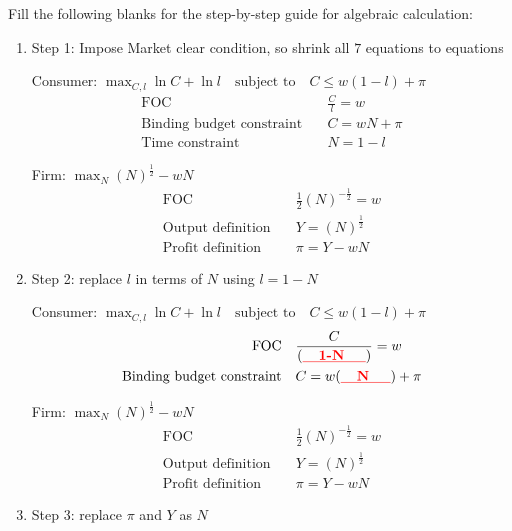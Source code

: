 \documentclass[14pt]{extarticle}
\newcommand{\red}[1]{\textcolor{red}{#1}}
\begin{document}
Fill the following blanks for the step-by-step guide for algebraic calculation:

\begin{enumerate}
    \item Step 1: Impose Market clear condition, so shrink all $ 7 $ equations to \textbf{\red{\underline{ \quad}}} equations

    Consumer: $ \max_{C, l} \ln C + \ln l \quad \text{subject to} \quad C \le w( 1-l ) + \pi $
    \begin{align}
        \text{FOC} \quad
            & \frac{C}{l} = w
            \label{eq:consumerFOC}
        \\
        \text{Binding budget constraint} \quad
            & C = w N + \pi
            \label{eq:binding_budget}
        \\
        \text{Time constraint} \quad
            & N = 1 - l
            \label{eq:time_budget}
    \end{align}

    Firm: $ \max_{N} ( N )^{\frac{1}{2}} - w N $
    \begin{align}
        \text{FOC} \quad
            & \frac{1}{2} ( N )^{- \frac{1}{2}} = w
            \label{eq:firmFOC}
        \\
        \text{Output definition} \quad
            & Y = ( N )^{\frac{1}{2}}
            \label{eq:outputDef}
        \\
        \text{Profit definition} \quad
            & \pi = Y - w N
            \label{eq:profitDef}
    \end{align}
    \item Step 2: replace $ l $ in terms of $ N $ using $ l = 1-N $

    Consumer: $ \max_{C, l} \ln C + \ln l \quad \text{subject to} \quad C \le w( 1-l ) + \pi $
    \begin{align}
        \text{FOC} \quad
            & \frac{C}{(\textbf{\red{\underline{\quad 1-N \quad}}})} = w
            \label{eq:consumerFOC}
        \\
        \text{Binding budget constraint} \quad
            & C = w (\textbf{\red{\underline{\quad N \quad}}}) + \pi
            \label{eq:binding_budget}
    \end{align}

    Firm: $ \max_{N} ( N )^{\frac{1}{2}} - w N $
    \begin{align}
        \text{FOC} \quad
            & \frac{1}{2} ( N )^{- \frac{1}{2}} = w
            \label{eq:firmFOC}
        \\
        \text{Output definition} \quad
            & Y = ( N )^{\frac{1}{2}}
            \label{eq:outputDef}
        \\
        \text{Profit definition} \quad
            & \pi = Y - w N
            \label{eq:profitDef}
    \end{align}
    \item Step 3: replace $ \pi $ and $ Y $ as $ N $


\end{enumerate}
\end{document}
